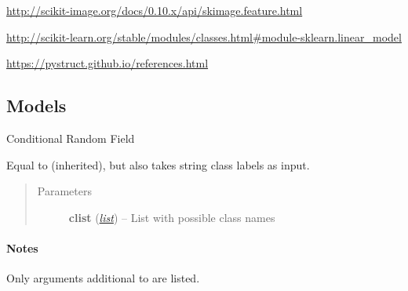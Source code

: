 \documentclass[letterpaper,10pt,english]{sphinxmanual}
\begin{document}


\href{http://scikit-image.org/docs/0.10.x/api/skimage.feature.html}{http://scikit-image.org/docs/0.10.x/api/skimage.feature.html}






\href{http://scikit-learn.org/stable/modules/classes.html\#module-sklearn.linear\_model}{http://scikit-learn.org/stable/modules/classes.html\#module-sklearn.linear\_model}






\href{https://pystruct.github.io/references.html}{https://pystruct.github.io/references.html}




\subsection{Models}
\label{classification:models}\label{classification:module-flamingo.classification.models}

\begin{fulllineitems}
\label{classification:flamingo.classification.models.ConditionalRandomField}
Conditional Random Field

Equal to  (inherited), but
also takes string class labels as input.
\begin{quote}\begin{description}
\item[{Parameters}] \leavevmode
\textbf{clist} (\href{http://docs.python.org/library/functions.html\#list}{\emph{list}}) -- List with possible class names

\end{description}\end{quote}
\paragraph{Notes}

Only arguments additional to  are listed.

\end{fulllineitems}
\end{document}
